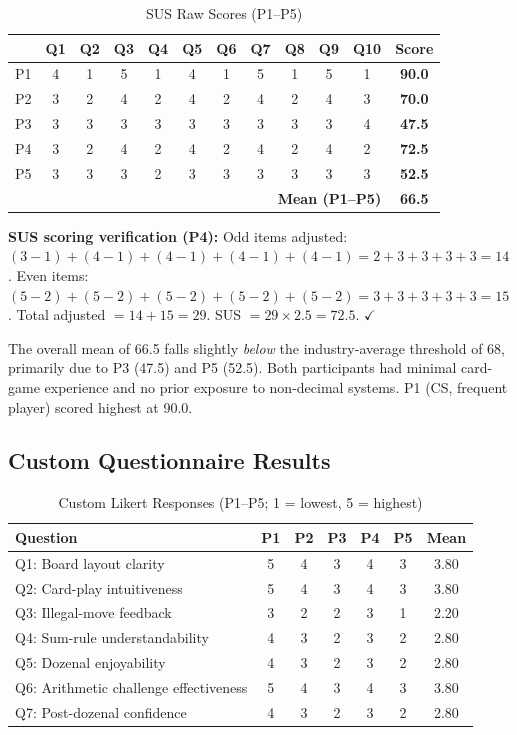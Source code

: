 \documentclass[12pt, titlepage]{article}
\begin{document}
\begin{table}[H]
\centering
\caption{SUS Raw Scores (P1--P5)}
\label{tab:sus-raw}
\begin{tabular}{c c c c c c c c c c c c}
\toprule
 & \textbf{Q1} & \textbf{Q2} & \textbf{Q3} & \textbf{Q4} & \textbf{Q5} & \textbf{Q6} & \textbf{Q7} & \textbf{Q8} & \textbf{Q9} & \textbf{Q10} & \textbf{Score} \\
\midrule
P1 & 4 & 1 & 5 & 1 & 4 & 1 & 5 & 1 & 5 & 1 & \textbf{90.0} \\
P2 & 3 & 2 & 4 & 2 & 4 & 2 & 4 & 2 & 4 & 3 & \textbf{70.0} \\
P3 & 3 & 3 & 3 & 3 & 3 & 3 & 3 & 3 & 3 & 4 & \textbf{47.5} \\
P4 & 3 & 2 & 4 & 2 & 4 & 2 & 4 & 2 & 4 & 2 & \textbf{72.5} \\
P5 & 3 & 3 & 3 & 2 & 3 & 3 & 3 & 3 & 3 & 3 & \textbf{52.5} \\
\midrule
\multicolumn{11}{r}{\textbf{Mean (P1--P5)}} & \textbf{66.5} \\
\bottomrule
\end{tabular}
\end{table}

\noindent \textbf{SUS scoring verification (P4):}
Odd items adjusted: $(3{-}1)+(4{-}1)+(4{-}1)+(4{-}1)+(4{-}1) = 2+3+3+3+3 = 14$.
Even items: $(5{-}2)+(5{-}2)+(5{-}2)+(5{-}2)+(5{-}2) = 3+3+3+3+3 = 15$.
Total adjusted $= 14 + 15 = 29$. SUS $= 29 \times 2.5 = 72.5$. $\checkmark$

\noindent The overall mean of 66.5 falls slightly \emph{below} the industry-average threshold of 68, primarily due to P3 (47.5) and P5 (52.5). Both participants had minimal card-game experience and no prior exposure to non-decimal systems. P1 (CS, frequent player) scored highest at 90.0.

\subsection{Custom Questionnaire Results}

\begin{table}[H]
\centering
\caption{Custom Likert Responses (P1--P5; 1 = lowest, 5 = highest)}
\label{tab:custom-likert}
\begin{tabular}{l c c c c c c}
\toprule
\textbf{Question} & \textbf{P1} & \textbf{P2} & \textbf{P3} & \textbf{P4} & \textbf{P5} & \textbf{Mean} \\
\midrule
Q1: Board layout clarity     & 5 & 4 & 3 & 4 & 3 & 3.80 \\
Q2: Card-play intuitiveness  & 5 & 4 & 3 & 4 & 3 & 3.80 \\
Q3: Illegal-move feedback     & 3 & 2 & 2 & 3 & 1 & 2.20 \\
Q4: Sum-rule understandability & 4 & 3 & 2 & 3 & 2 & 2.80 \\
Q5: Dozenal enjoyability       & 4 & 3 & 2 & 3 & 2 & 2.80 \\
Q6: Arithmetic challenge effectiveness & 5 & 4 & 3 & 4 & 3 & 3.80 \\
Q7: Post-dozenal confidence    & 4 & 3 & 2 & 3 & 2 & 2.80 \\
\bottomrule
\end{tabular}
\end{table}
\end{document}
